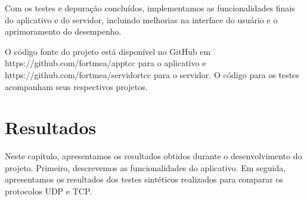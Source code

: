 \documentclass[12pt]{article}
\begin{document}
Com os testes e depuração concluídos, implementamos as funcionalidades finais do aplicativo e do servidor, incluindo melhorias na interface do usuário e o aprimoramento do desempenho.

O código fonte do projeto está disponível no GitHub em  https://github.com/fortmea/apptcc para o aplicativo e https://github.com/fortmea/servidortcc para o servidor. O código para os testes acompanham seus respectivos projetos.

\section{Resultados}
Neste capítulo, apresentamos os resultados obtidos durante o desenvolvimento do projeto. Primeiro, descrevemos as funcionalidades do aplicativo. Em seguida, apresentamos os resultados dos testes sintéticos realizados para comparar os protocolos UDP e TCP.
\end{document}
